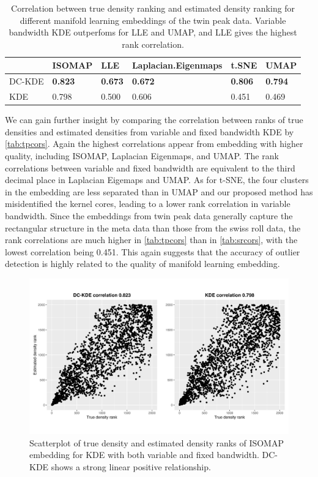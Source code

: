 \documentclass[11pt,a4paper,]{article}
\begin{document}
\begin{table}

\caption{\label{tab:tpcors}Correlation between true density ranking and estimated density ranking for different manifold learning embeddings of the twin peak data. Variable bandwidth KDE outperfoms for LLE and UMAP, and LLE gives the highest rank correlation.}
\centering
\begin{tabular}[t]{l>{}l>{}l>{}l>{}l>{}l}
\toprule
  & ISOMAP & LLE & Laplacian.Eigenmaps & t.SNE & UMAP\\
\midrule
DC-KDE & \textbf{0.823} & \textbf{0.673} & \textbf{0.672} & \textbf{0.806} & \textbf{0.794}\\
KDE & 0.798 & 0.500 & 0.606 & 0.451 & 0.469\\
\bottomrule
\end{tabular}
\end{table}

We can gain further insight by comparing the correlation between ranks of true densities and estimated densities from variable and fixed bandwidth KDE by \autoref{tab:tpcors}. Again the highest correlations appear from embedding with higher quality, including ISOMAP, Laplacian Eigenmaps, and UMAP. The rank correlations between variable and fixed bandwidth are equivalent to the third decimal place in Laplacian Eigemaps and UMAP. As for t-SNE, the four clusters in the embedding are less separated than in UMAP and our proposed method has misidentified the kernel cores, leading to a lower rank correlation in variable bandwidth. Since the embeddings from twin peak data generally capture the rectangular structure in the meta data than those from the swiss roll data, the rank correlations are much higher in \autoref{tab:tpcors} than in \autoref{tab:srcors}, with the lowest correlation being 0.451. This again suggests that the accuracy of outlier detection is highly related to the quality of manifold learning embedding.

\begin{figure}

{\centering \includegraphics[width=0.95\linewidth]{figures/Twin Peak2000_density_isomap_r0_5_rank_nocolor} 

}

\caption{Scatterplot of true density and estimated density ranks of ISOMAP embedding for KDE with both variable and fixed bandwidth. DC-KDE shows a strong linear positive relationship.}\label{fig:tpisomapden}
\end{figure}
\end{document}
